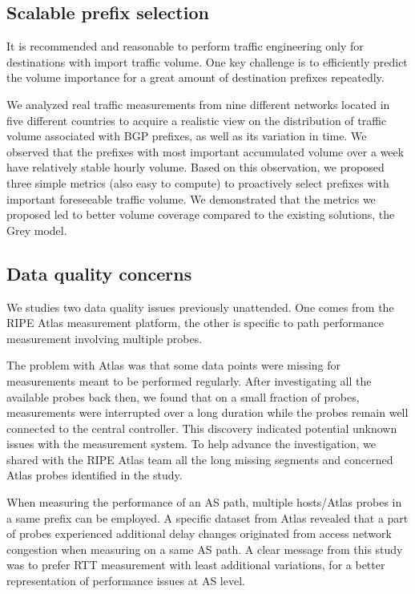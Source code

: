 \subsection{Scalable prefix selection}
It is recommended and reasonable to perform traffic engineering only for destinations with import traffic volume. One key challenge is to efficiently predict the volume importance for a great amount of destination prefixes repeatedly.

We analyzed real traffic measurements from nine different networks located in five different countries to acquire a realistic view on the distribution of traffic volume associated with BGP prefixes, as well as its variation in time.   
We observed that the prefixes with most important accumulated volume over a week have relatively stable hourly volume. 
Based on this observation, we proposed three simple 
metrics (also easy to compute) to proactively select prefixes with important foreseeable traffic volume.
We demonstrated that the metrics we proposed led to better volume coverage compared to the existing solutions, the Grey model.

\subsection{Data quality concerns}
We studies two data quality issues previously unattended. One comes from the RIPE Atlas measurement platform, the other is specific to path performance measurement involving multiple probes.

The problem with Atlas was that some data points were missing for measurements meant to be performed regularly.
After investigating all the available probes back then, we found that on a small fraction of probes, measurements were interrupted over a long duration while the probes remain well connected to the central controller.
This discovery indicated potential unknown issues with the measurement system.
To help advance the investigation, we shared with the RIPE Atlas team all the long missing segments and concerned Atlas probes identified in the study.

When measuring the performance of an AS path, multiple hosts/Atlas probes in a same  prefix can be employed. A specific dataset from Atlas revealed that a part of probes experienced additional delay changes originated from access network congestion when measuring on a same AS path.  A clear message from this study was to prefer RTT measurement with least additional variations, for a better representation of performance issues at AS level.


